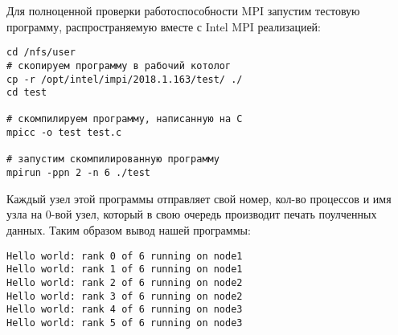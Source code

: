 Для полноценной проверки работоспособности MPI запустим
тестовую программу, распространяемую вместе с Intel MPI
реализацией:
\begin{verbatim}
cd /nfs/user
# скопируем программу в рабочий котолог
cp -r /opt/intel/impi/2018.1.163/test/ ./
cd test

# скомпилируем программу, написанную на C
mpicc -o test test.c

# запустим скомпилированную программу
mpirun -ppn 2 -n 6 ./test
\end{verbatim}

Каждый узел этой программы отправляет свой номер, кол-во 
процессов и имя узла на 0-вой узел, который в свою очередь
производит печать поулченных данных. Таким образом
вывод нашей программы:
\begin{verbatim}
Hello world: rank 0 of 6 running on node1
Hello world: rank 1 of 6 running on node1
Hello world: rank 2 of 6 running on node2
Hello world: rank 3 of 6 running on node2
Hello world: rank 4 of 6 running on node3
Hello world: rank 5 of 6 running on node3
\end{verbatim}